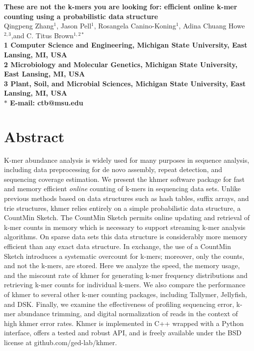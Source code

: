 \documentclass{article}
\begin{document}
\begin{flushleft}
{\Large \textbf{These are not the k-mers you are looking for: efficient
online k-mer counting using a probabilistic data structure}}
\\
Qingpeng Zhang$^{1}$, 
Jason Pell$^{1}$,
Rosangela Canino-Koning$^{1}$,
Adina Chuang Howe$^{2,3}$,and 
C. Titus Brown$^{1,2\ast}$
\\
\bf{1} Computer Science and Engineering, Michigan State University, East Lansing, MI, USA
\\
\bf{2} Microbiology and Molecular Genetics, Michigan State University, East Lansing, MI, USA
\\
\bf{3} Plant, Soil, and Microbial Sciences, Michigan State University, East Lansing, MI, USA
\\
$\ast$ E-mail: ctb@msu.edu
\end{flushleft}

\section{Abstract}

K-mer abundance analysis is widely used for many purposes in sequence
analysis, including data preprocessing for de novo assembly, repeat
detection, and sequencing coverage estimation.
We present the khmer software package for fast and memory efficient
{\em online} counting of k-mers in sequencing
data sets. Unlike previous methods based on data structures such as
hash tables, suffix arrays, and trie structures, khmer relies entirely
on a simple probabilistic data structure, a CountMin Sketch.  The
CountMin Sketch permits online updating and retrieval of k-mer counts
in memory which is necessary to support streaming k-mer analysis algorithms.
On sparse data sets this data structure is considerably more memory
efficient than any exact data structure.  In exchange, the use of a
CountMin Sketch introduces a systematic overcount for k-mers;
moreover, only the counts, and not the k-mers, are stored.
Here we analyze the speed, the memory usage, and the miscount rate of khmer
for generating k-mer frequency distributions and retrieving k-mer
counts for individual k-mers.  We also compare the performance of
khmer to several other k-mer counting packages, including Tallymer,
Jellyfish, and DSK.  Finally, we examine the effectiveness of profiling sequencing error, 
k-mer abundance trimming, and
digital normalization of reads in the context of high khmer error
rates. Khmer is implemented in C++ wrapped with a Python
interface, offers a tested and robust API, and is freely available
under the BSD license at github.com/ged-lab/khmer.
\end{document}
